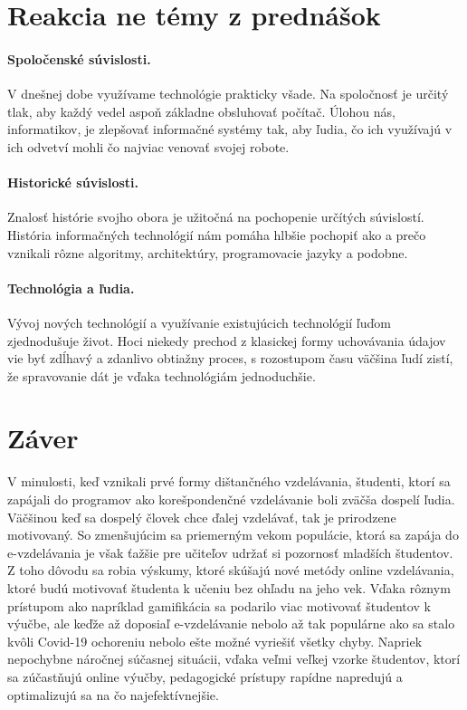 \documentclass[10pt,slovak,a4paper]{article}
\begin{document}
\section{Reakcia ne témy z prednášok} \label{reakcia}
	\paragraph{Spoločenské súvislosti.}

	V dnešnej dobe využívame technológie prakticky všade. Na spoločnosť je určitý tlak, aby každý vedel aspoň základne obsluhovať počítač. Úlohou nás, informatikov, je zlepšovať informačné systémy tak, aby ľudia, čo ich využívajú v ich odvetví mohli čo najviac venovať svojej robote. 

	\paragraph{Historické súvislosti.}

	Znalosť histórie svojho obora je užitočná na pochopenie určítých súvislostí. História informačných technológií nám pomáha hlbšie pochopiť ako a prečo vznikali rôzne algoritmy, architektúry, programovacie jazyky a podobne.

	\paragraph{Technológia a ľudia.}

	Vývoj nových technológií a využívanie existujúcich technológií ľuďom zjednodušuje život. Hoci niekedy prechod z klasickej formy uchovávania údajov vie byť zdĺhavý a zdanlivo obtiažny proces, s rozostupom času väčšina ľudí zistí, že spravovanie dát je vďaka technológiám jednoduchšie.



\section{Záver} \label{zaver}

V minulosti, keď vznikali prvé formy dištančného vzdelávania, študenti, ktorí sa zapájali do programov ako korešpondenčné vzdelávanie boli zväčša dospelí ľudia. Väčšinou keď sa dospelý človek chce ďalej vzdelávať, tak je prirodzene motivovaný. So zmenšujúcim sa priemerným  vekom populácie, ktorá sa zapája do e-vzdelávania je však ťažšie pre učiteľov udržať si pozornosť mladších študentov. Z toho dôvodu sa robia výskumy, ktoré skúšajú nové metódy online vzdelávania, ktoré budú motivovať študenta k učeniu bez ohľadu na jeho vek. Vďaka rôznym prístupom ako napríklad gamifikácia sa podarilo viac motivovať študentov k výučbe, ale keďže až doposiaľ e-vzdelávanie nebolo až tak populárne ako sa stalo kvôli Covid-19 ochoreniu nebolo ešte možné vyriešiť všetky chyby. Napriek nepochybne náročnej súčasnej situácii, vďaka veľmi veľkej vzorke študentov, ktorí sa zúčastňujú online výučby, pedagogické prístupy rapídne napredujú a optimalizujú sa na čo najefektívnejšie.


\end{document}
